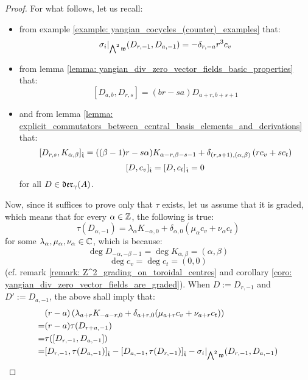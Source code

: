 \begin{proof}
                For what follows, let us recall:
                \begin{itemize}
                    \item from example \ref{example: yangian_cocycles_(counter)_examples} that:
                        $$\sigma_i|_{ \bigwedge^2 \frakw }(D_{r, -1}, D_{a, -1}) = -\delta_{r, -a} r^3 c_v$$
                    \item from lemma \ref{lemma: yangian_div_zero_vector_fields_basic_properties} that:
                        $$[D_{a, b}, D_{r, s}] = (br - sa) D_{a + r, b + s + 1}$$
                    \item and from lemma \ref{lemma: explicit_commutators_between_central_basis_elements_and_derivations} that:
                        $$[D_{r, s}, K_{\alpha, \beta}]_{\extendedtoroidal} = ((\beta - 1)r - s\alpha) K_{\alpha - r, \beta - s - 1} + \delta_{(r, s + 1), (\alpha, \beta)} \left( r c_v + s c_t \right)$$
                        $$[D, c_v]_{\extendedtoroidal} = [D, c_t]_{\extendedtoroidal} = 0$$
                    for all $D \in \divzero$.
                \end{itemize}
                Now, since it suffices to prove only that $\tau$ exists, let us assume that it is graded, which means that for every $\alpha \in \Z$, the following is true:
                    $$\tau(D_{\alpha, -1}) = \lambda_{\alpha} K_{-\alpha, 0} + \delta_{\alpha, 0}( \mu_{\alpha} c_v + \nu_{\alpha} c_t )$$
                for some $\lambda_{\alpha}, \mu_{\alpha}, \nu_{\alpha} \in \bbC$, which is because:
                    $$\deg D_{-\alpha, -\beta - 1} = \deg K_{\alpha, \beta} = (\alpha, \beta)$$
                    $$\deg c_v = \deg c_t = (0, 0)$$
                (cf. remark \ref{remark: Z^2_grading_on_toroidal_centres} and corollary \ref{coro: yangian_div_zero_vector_fields_are_graded}). When $D := D_{r, -1}$ and $D' := D_{a, -1}$, the above shall imply that:
                    $$
                        \begin{aligned}
                            & (r - a) \left( \lambda_{a + r} K_{-a - r, 0} + \delta_{a + r, 0}( \mu_{a + r} c_v + \nu_{a + r} c_t ) \right)
                            \\
                            = & (r - a) \tau( D_{r + a, -1} )
                            \\
                            = & \tau( [D_{r, -1}, D_{a, -1}] )
                            \\
                            = & [ D_{r, -1}, \tau(D_{a, -1}) ]_{\extendedtoroidal} - [ D_{a, -1}, \tau(D_{r, -1}) ]_{\extendedtoroidal} - \sigma_i|_{\bigwedge^2 \frakw}(D_{r, -1}, D_{a, -1})

\end{aligned}$$
\end{proof}
